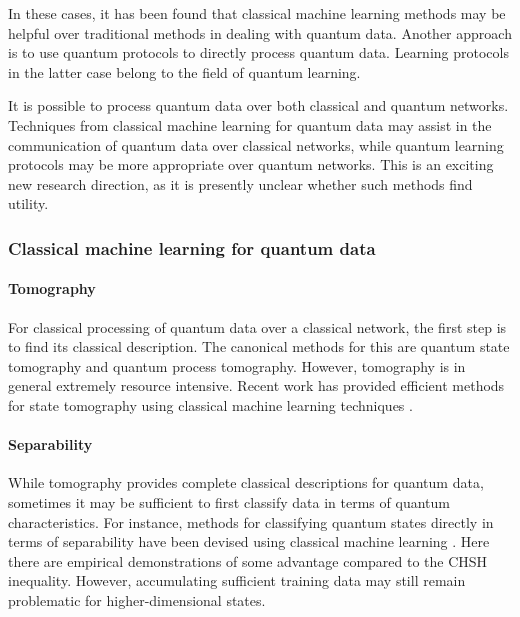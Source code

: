 In these cases, it has been found that classical machine learning methods may be helpful over traditional methods in dealing with quantum data. Another approach is to use quantum protocols to directly process quantum data. Learning protocols in the latter case belong to the field of quantum learning.

It is possible to process quantum data over both classical and quantum networks. Techniques from classical machine learning for quantum data may assist in the communication of quantum data over classical networks, while quantum learning protocols may be more appropriate over quantum networks. This is an exciting new research direction, as it is presently unclear whether such methods find utility.

\subsubsection{Classical machine learning for quantum data}

\paragraph{Tomography}

For classical processing of quantum data over a classical network, the first step is to find its classical description. The canonical methods for this are quantum state tomography and quantum process tomography. However, tomography is in general extremely resource intensive. Recent work has provided efficient methods for state tomography using classical machine learning techniques \cite{bib:Torlai2017, bib:Han2017}.

\paragraph{Separability}

While tomography provides complete classical descriptions for quantum data, sometimes it may be sufficient to first classify data in terms of quantum characteristics. For instance, methods for classifying quantum states directly in terms of separability have been devised using classical machine learning \cite{bib:Ma2017, bib:Su2017, bib:Gao2018}. Here there are empirical demonstrations of some advantage compared to the CHSH inequality. However, accumulating sufficient training data may still remain problematic for higher-dimensional states.

